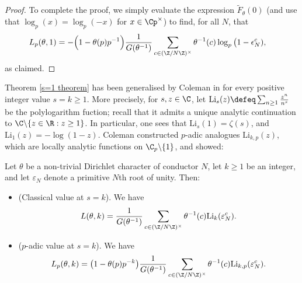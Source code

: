 \documentclass[a4paper,10pt, english, reqno]{smfart}
\numberwithin{equation}{section}
\begin{document}
\begin{proof}
To complete the proof, we simply evaluate the expression $\widetilde{F}_\theta(0)$ (and use that $\log_p(x) = \log_p(-x)$ for $x \in \Cp^\times$) to find, for all $N$, that
\begin{align*}
L_p(\theta,1)    &= -\Big(1 - \theta(p)p^{-1}\Big)\frac{1}{G(\theta^{-1})} 		\sum_{c \in (\Z/N\Z)^\times} \theta^{-1}(c) \log_p\big(1- \epsilon_N^c),
\end{align*}
as claimed.
\end{proof}


\begin{remark}
Theorem \ref{s=1 theorem} has been generalised by Coleman in \cite{Colemandilog} for every positive integer value $s = k\geq 1$. More precisely, for $s, z \in \C$, let $\mathrm{Li}_s(z) \defeq \sum_{n \geq 1} \frac{z^n}{n^s}$ be the polylogarithm fuction; recall that it admits a unique analytic continuation to $\C \backslash\{ z \in \R : z \geq 1\}$. In particular, one sees that $\mathrm{Li}_s(1) = \zeta(s)$, and $\mathrm{Li}_1(z) = - \log(1 - z)$. Coleman constructed $p$-adic analogues $\mathrm{Li}_{k, p}(z)$, which are locally analytic functions on $\C_p \backslash \{1\}$, and showed:

\begin{theorem}  \label{s=k theorem} Let $\theta$ be a non-trivial Dirichlet character of conductor $N$, let $k \geq 1$ be an integer, and let $\varepsilon_N$ denote a primitive $N$th root of unity. Then:
\begin{itemize}
\item[(i)] (Classical value at $s=k$). We have
\[L(\theta,k) = \frac{1}{G(\theta^{-1})} \sum_{c \in (\Z/N\Z)^\times} \theta^{-1}(c) \mathrm{Li}_{k}(\varepsilon_N^c).\]
\item[(ii)] ($p$-adic value at $s=k$). We have
\[ L_p(\theta,k) = \big( 1 - \theta(p) p^{-k} \big) \frac{1}{G(\theta^{-1})} 		\sum_{c \in (\Z/N\Z)^\times} \theta^{-1}(c) \mathrm{Li}_{k, p}(\varepsilon_N^c).\]
\end{itemize}
\end{theorem}
\end{remark}
\end{document}
